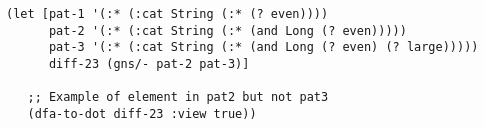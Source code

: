 \begin{lstlisting}[style=reclojureClojure]
(let [pat-1 '(:* (:cat String (:* (? even))))
      pat-2 '(:* (:cat String (:* (and Long (? even)))))
      pat-3 '(:* (:cat String (:* (and Long (? even) (? large)))))
      diff-23 (gns/- pat-2 pat-3)]

   ;; Example of element in pat2 but not pat3
   (dfa-to-dot diff-23 :view true))
\end{lstlisting}
